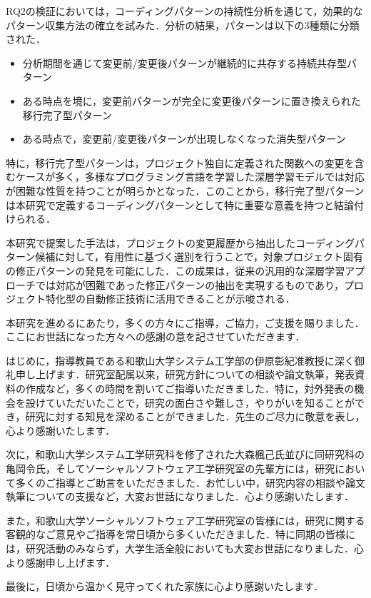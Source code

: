 \documentclass[11pt]{jreport}
\begin{document}
RQ2の検証においては，コーディングパターンの持続性分析を通じて，効果的なパターン収集方法の確立を試みた．分析の結果，パターンは以下の3種類に分類された．
\begin{itemize}
    \item 分析期間を通じて変更前/変更後パターンが継続的に共存する持続共存型パターン
    \item ある時点を境に，変更前パターンが完全に変更後パターンに置き換えられた移行完了型パターン
    \item ある時点で，変更前/変更後パターンが出現しなくなった消失型パターン
\end{itemize}

特に，移行完了型パターンは，プロジェクト独自に定義された関数への変更を含むケースが多く，多様なプログラミング言語を学習した深層学習モデルでは対応が困難な性質を持つことが明らかとなった．このことから，移行完了型パターンは本研究で定義するコーディングパターンとして特に重要な意義を持つと結論付けられる．

本研究で提案した手法は，プロジェクトの変更履歴から抽出したコーディングパターン候補に対して，有用性に基づく選別を行うことで，対象プロジェクト固有の修正パターンの発見を可能にした．この成果は，従来の汎用的な深層学習アプローチでは対応が困難であった修正パターンの抽出を実現するものであり，プロジェクト特化型の自動修正技術に活用できることが示唆される．

\begin{acknowledgements}
本研究を進めるにあたり，多くの方々にご指導，ご協力，ご支援を賜りました．ここにお世話になった方々への感謝の意を記させていただきます．

はじめに，指導教員である和歌山大学システム工学部の伊原彰紀准教授に深く御礼申し上げます．研究室配属以来，研究方針についての相談や論文執筆，発表資料の作成など，多くの時間を割いてご指導いただきました．特に，対外発表の機会を設けていただいたことで，研究の面白さや難しさ，やりがいを知ることができ，研究に対する知見を深めることができました．先生のご尽力に敬意を表し，心より感謝いたします．

次に，和歌山大学システム工学研究科を修了された大森楓己氏並びに同研究科の亀岡令氏，そしてソーシャルソフトウェア工学研究室の先輩方には，研究において多くのご指導とご助言をいただきました．お忙しい中，研究内容の相談や論文執筆についての支援など，大変お世話になりました．心より感謝いたします．

また，和歌山大学ソーシャルソフトウェア工学研究室の皆様には，研究に関する客観的なご意見やご指導を常日頃から多くいただきました．特に同期の皆様には，研究活動のみならず，大学生活全般においても大変お世話になりました．心より感謝申し上げます．

最後に，日頃から温かく見守ってくれた家族に心より感謝いたします．

\end{acknowledgements}



\end{document}
